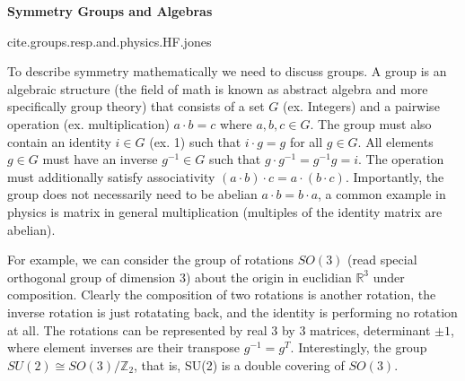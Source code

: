 \textbf{Symmetry Groups and Algebras}

cite.groups.resp.and.physics.HF.jones

To describe symmetry mathematically we need to discuss groups. A group
is an algebraic structure (the field of math is known as abstract algebra and more specifically group theory) that 
consists of a set $G$ (ex. Integers) and a pairwise operation (ex. multiplication) $a\cdot b = c$ where $a,b, c\in G$.
The group must also contain an identity $i \in G$ (ex. 1) such that $i\cdot g = g$ for all $g\in G$. All elements 
$g\in G$ must have an inverse $g^{-1} \in G$ such that $g \cdot g^{-1} = g^{-1} g = i$. The operation must additionally
satisfy associativity $(a\cdot b) \cdot c = a \cdot (b \cdot c)$. Importantly, the group does not necessarily 
need to be abelian $a\cdot b = b \cdot a$, a common example in physics is matrix in general multiplication (multiples of the 
identity matrix are abelian).

For example, we can consider the group of rotations $SO(3)$ (read special orthogonal group of
dimension 3) about the origin in euclidian $\mathbb{R}^3$ under composition. Clearly the composition
of two rotations is another rotation, the inverse rotation is just rotatating back, and the identity is
performing no rotation at all. The rotations can be represented by real 3 by 3 matrices, determinant $\pm 1$, 
where element inverses are their transpose $g^{-1}=g^T$. Interestingly, the group $SU(2) \cong SO(3) / \mathbb{Z}_2$, that is, 
SU(2) is a double covering of $SO(3)$. 

